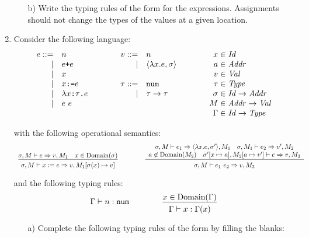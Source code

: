 \begin{enumerate}
\begin{itemize}
\item[b)] Write the typing rules of the form 
for the expressions.
Assignments should not change the types of the values at a given location.
\end{itemize}

\item Consider the following language:
\[
\begin{array}{rllrllr@{\hskip3pt}l}
e ::= & n &\qquad& v ::= & n &\qquad& x\in & \mathit{Id} \\
\mid& e\verb!+!e &&\mid& \langle \lambda x.e, \sigma \rangle 
&& a\in & \mathit{Addr} \\
\mid& x &&&&& v\in & \mathit{Val} \\
\mid& x\verb+:=+e &\qquad& \tau ::= & \verb+num+ && \tau\in & \mathit{Type} \\ 
\mid& \lambda x\verb+:+\tau\verb+.+e &&\mid& \tau\rightarrow\tau
&& \sigma\in & \mathit{Id}\rightarrow\mathit{Addr} \\
\mid& e\ e&&&&& M\in & \mathit{Addr}\rightarrow\mathit{Val} \\
&&&&&& \Gamma\in & \mathit{Id}\rightarrow\mathit{Type}\\
\end{array}
\]

with the following operational semantics:
\[
\begin{array}{ccc}
\newinfrule
{ \sigma,M\vdash e\Rightarrow v,M_1 \rulesep
  x\in\mbox{Domain}(\sigma) }
{ \sigma,M\vdash x:=e\Rightarrow v,M_1[\sigma(x)\mapsto v] }
&\qquad&
\newinfrule
{ \begin{array}{c}
  \sigma,M\vdash e_1\Rightarrow \langle \lambda x.e,\sigma'\rangle,M_1 \rulesep
  \sigma,M_1\vdash e_2\Rightarrow v',M_2 \\
  a\not\in\mbox{Domain}(M_2) \rulesep
  \sigma'[x\mapsto a],M_2[a\mapsto v']\vdash e\Rightarrow v,M_3
\end{array} }
{ \sigma,M\vdash e_1\ e_2\Rightarrow v,M_3 } \\
\end{array}
\]

and the following typing rules:
\[
\begin{array}{ccc}
\typed{n}{\code{num}}
&\qquad&
\newinfrule
{ x\in\mbox{Domain}(\Gamma) }
{ \typed{x}{\Gamma(x)} }
\end{array}
\]

\begin{itemize}
\item[a)] Complete the following typing rules of the form
by filling the blanks:


\end{itemize}
\end{enumerate}
